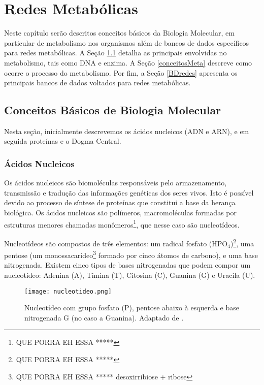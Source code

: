 \chapter{Redes Metabólicas}
 
\indent Neste capítulo serão descritos conceitos básicos da Biologia Molecular, em particular de metabolismo nos organismos além de bancos de dados específicos para redes metabólicas. A Seção \ref{conceitosBM} detalha as principais envolvidas no metabolismo, tais como DNA e enzima. A Seção \ref{conceitosMeta} descreve como ocorre o processo do metabolismo. Por fim, a Seção \ref{BDredes} apresenta os principais bancos de dados voltados para redes metabólicas.




\section{Conceitos Básicos de Biologia Molecular} \label{conceitosBM}

\indent Nesta seção, inicialmente descrevemos os ácidos nucleicos (ADN e ARN), e em seguida proteínas e o Dogma Central.

\subsection{Ácidos Nucleicos} \label{aceidosNucleicos}

\indent Os ácidos nucleicos são biomoléculas responsáveis pelo armazenamento, transmissão e tradução das informações genéticas dos seres vivos. Isto é possível devido ao processo de síntese de proteínas que constitui a base da herança biológica. Os ácidos nucleicos são polímeros, macromoléculas formadas por estruturas menores chamadas monômeros\footnote{QUE PORRA EH ESSA *****}, que nesse caso são nucleotídeos.

\indent Nucleotídeos são compostos de três elementos: um radical fosfato (HPO$_{4}$)\footnote{QUE PORRA EH ESSA *****}, uma pentose (um monossacarídeo\footnote{QUE PORRA EH ESSA ***** desoxirribiose + ribose} formado por cinco átomos de carbono), e uma base nitrogenada. Existem cinco tipos de bases nitrogenadas que podem compor um nucleotídeo: Adenina (A), Timina (T), Citosina (C), Guanina (G) e Uracila (U). \\

\begin{figure}[h]
    \centering
    \texttt{[image: nucleotideo.png]}
    \caption{Nucleotídeo com grupo fosfato (P), pentose abaixo à esquerda e base nitrogenada G (no caso a Guanina). Adaptado de \cite{dnadiscovery08}. }
    \label{fig:Nucleotideo}
\end{figure} 

